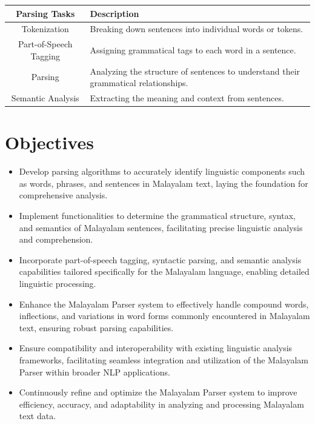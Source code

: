 \documentclass[12pt,a4paper,titlepage]{report}
\begin{document}
	
	

	\begin{center}
		\begin{tabular}{|c|p{12cm}|}
			\hline
			\textbf{Parsing Tasks} & \textbf{Description} \\
			\hline
			Tokenization & Breaking down sentences into individual words or tokens. \\
			\hline
			Part-of-Speech Tagging & Assigning grammatical tags to each word in a sentence. \\
			\hline
			Parsing & Analyzing the structure of sentences to understand their grammatical relationships. \\
			\hline
			Semantic Analysis & Extracting the meaning and context from sentences. \\
			\hline
		\end{tabular}
		\label{tab:parsing_tasks}
	\end{center}

	
	\section{Objectives}
	
	\begin{itemize}
		\item Develop parsing algorithms to accurately identify linguistic
		components such as words, phrases, and sentences in Malayalam
		text, laying the foundation for comprehensive analysis.
		\item Implement functionalities to determine the grammatical structure,
		syntax, and semantics of Malayalam sentences, facilitating precise
		linguistic analysis and comprehension.
		\item Incorporate part-of-speech tagging, syntactic parsing, and
		semantic analysis capabilities tailored specifically for the
		Malayalam language, enabling detailed linguistic processing.
		\item Enhance the Malayalam Parser system to effectively handle
		compound words, inflections, and variations in word forms
		commonly encountered in Malayalam text, ensuring robust parsing
		capabilities.
		\item Ensure compatibility and interoperability with existing linguistic
		analysis frameworks, facilitating seamless integration and
		utilization of the Malayalam Parser within broader NLP
		applications.
		\item Continuously refine and optimize the Malayalam Parser system to
		improve efficiency, accuracy, and adaptability in analyzing and
		processing Malayalam text data.
	\end{itemize}
	
\end{document}
